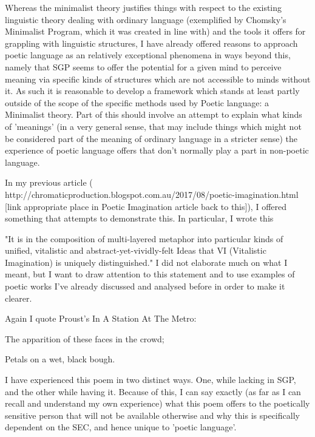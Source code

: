 \documentclass[]{article}
\begin{document}
Whereas the minimalist theory justifies things with respect to the existing linguistic theory dealing with ordinary language (exemplified by Chomsky's Minimalist Program, which it was created in line with) and the tools it offers for grappling with linguistic structures, I have already offered reasons to approach poetic language as an relatively exceptional phenomena in ways beyond this, namely that SGP seems to offer the potential for a given mind to perceive meaning via specific kinds of structures which are not accessible to minds without it. As such it is reasonable to develop a framework which stands at least partly outside of the scope of the specific methods used by Poetic language: a Minimalist theory. Part of this should involve an attempt to explain what kinds of 'meanings' (in a very general sense, that may include things which might not be considered part of the meaning of ordinary language in a stricter sense) the experience of poetic language offers that don't normally play a part in non-poetic language.



In my previous article ( http://chromaticproduction.blogspot.com.au/2017/08/poetic-imagination.html [link appropriate place in Poetic Imagination article back to this]), I offered something that attempts to demonstrate this. In particular, I wrote this

"It is in the composition of multi-layered metaphor into particular kinds of unified, vitalistic and abstract-yet-vividly-felt Ideas that VI (Vitalistic Imagination) is uniquely distinguished." I did not elaborate much on what I meant, but I want to draw attention to this statement and to use examples of poetic works I've already discussed and analysed before in order to make it clearer.



Again I quote Proust's In A Station At The Metro:



The apparition of these faces in the crowd;

Petals on a wet, black bough.



I have experienced this poem in two distinct ways. One, while lacking in SGP, and the other while having it. Because of this, I can say exactly (as far as I can recall and understand my own experience) what this poem offers to the poetically sensitive person that will not be available otherwise and why this is specifically dependent on the SEC, and hence unique to 'poetic language'.
\end{document}
